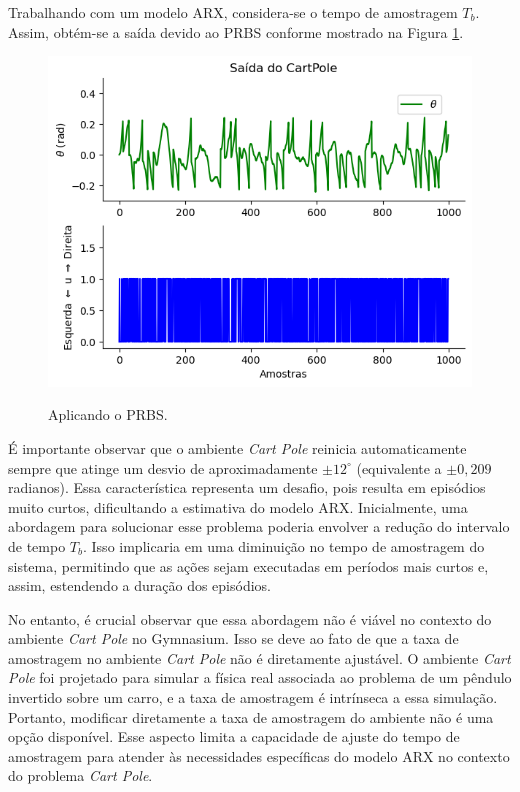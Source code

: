 \documentclass[12pt,           %
a4paper,                       %
openany,                       %
oneside,                       %
chapter=TITLE,                 %
english,                       %
spanish,                       %
brazil,                        %
sumario=tradicional]{abntex2}  %
\begin{document}
\begin{OnehalfSpace}
Trabalhando com um modelo ARX, considera-se o tempo de amostragem $T_b$. Assim, obtém-se a saída devido ao PRBS conforme mostrado na Figura \ref{fig:PRBSa}.

\begin{figure}[H]
     \centering
     \vspace*{-.2cm}
     \caption{Aplicando o PRBS.}
     \includegraphics[scale=0.575]{teste.png}
     \label{fig:PRBSa}
\end{figure}
\vspace*{-0.7cm}
{\raggedright {}}

É importante observar que o ambiente \textit{Cart Pole} reinicia automaticamente sempre que atinge um desvio de aproximadamente $\pm 12^\circ$ (equivalente a $\pm 0,209$ radianos). Essa característica representa um desafio, pois resulta em episódios muito curtos, dificultando a estimativa do modelo ARX. Inicialmente, uma abordagem para solucionar esse problema poderia envolver a redução do intervalo de tempo $T_b$. Isso implicaria em uma diminuição no tempo de amostragem do sistema, permitindo que as ações sejam executadas em períodos mais curtos e, assim, estendendo a duração dos episódios.

No entanto, é crucial observar que essa abordagem não é viável no contexto do ambiente \textit{Cart Pole} no Gymnasium. Isso se deve ao fato de que a taxa de amostragem no ambiente \textit{Cart Pole} não é diretamente ajustável. O ambiente \textit{Cart Pole} foi projetado para simular a física real associada ao problema de um pêndulo invertido sobre um carro, e a taxa de amostragem é intrínseca a essa simulação. Portanto, modificar diretamente a taxa de amostragem do ambiente não é uma opção disponível. Esse aspecto limita a capacidade de ajuste do tempo de amostragem para atender às necessidades específicas do modelo ARX no contexto do problema \textit{Cart Pole}.


\end{OnehalfSpace}
\end{document}
